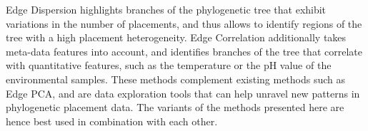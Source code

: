 Edge Dispersion highlights branches of the phylogenetic tree that exhibit variations in the number of placements,
and thus allows to identify regions of the tree with a high placement heterogeneity.
Edge Correlation additionally takes meta-data features into account,
and identifies branches of the tree that correlate with quantitative features,
such as the temperature or the pH value of the environmental samples.
These methods complement existing methods such as Edge PCA,
and are data exploration tools that can help unravel new patterns in phylogenetic placement data.
The variants of the methods presented here are hence best used in combination with each other.



